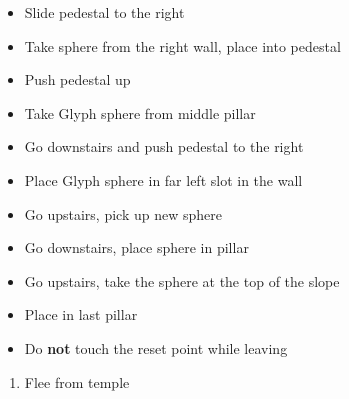 \begin{trial}
    \begin{itemize}
        \item Slide pedestal to the right
        \item Take sphere from the right wall, place into pedestal
        \item Push pedestal up
        \item Take Glyph sphere from middle pillar
        \item Go downstairs and push pedestal to the right
        \item Place Glyph sphere in far left slot in the wall
        \item Go upstairs, pick up new sphere
        \item Go downstairs, place sphere in pillar
        \item Go upstairs, take the sphere at the top of the slope
        \item Place in last pillar
        \item Do \textbf{not} touch the reset point while leaving
    \end{itemize}
\end{trial}
\begin{enumerate}[resume]
    \item Flee from temple
\end{enumerate}
\bothcb
{}
